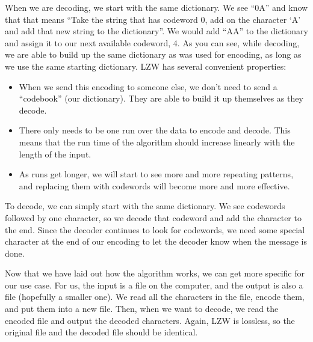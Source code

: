 \documentclass[12pt,twoside]{reedthesis}
\providecommand{\tightlist}{%
  \setlength{\itemsep}{0pt}\setlength{\parskip}{0pt}}
\begin{document}
When we are decoding, we start with the same dictionary. We see ``0A'' and know that that means ``Take the string that has codeword 0, add on the character `A' and add that new string to the dictionary''. We would add ``AA'' to the dictionary and assign it to our next available codeword, 4. As you can see, while decoding, we are able to build up the same dictionary as was used for encoding, as long as we use the same starting dictionary.
LZW has several convenient properties:
\begin{itemize}
\tightlist
\item
  When we send this encoding to someone else, we don't need to send a ``codebook'' (our dictionary). They are able to build it up themselves as they decode.
\item
  There only needs to be one run over the data to encode and decode. This means that the run time of the algorithm should increase linearly with the length of the input.
\item
  As runs get longer, we will start to see more and more repeating patterns, and replacing them with codewords will become more and more effective.
\end{itemize}
To decode, we can simply start with the same dictionary. We see codewords followed by one character, so we decode that codeword and add the character to the end. Since the decoder continues to look for codewords, we need some special character at the end of our encoding to let the decoder know when the message is done.

Now that we have laid out how the algorithm works, we can get more specific for our use case. For us, the input is a file on the computer, and the output is also a file (hopefully a smaller one). We read all the characters in the file, encode them, and put them into a new file. Then, when we want to decode, we read the encoded file and output the decoded characters. Again, LZW is lossless, so the original file and the decoded file should be identical.
\end{document}
